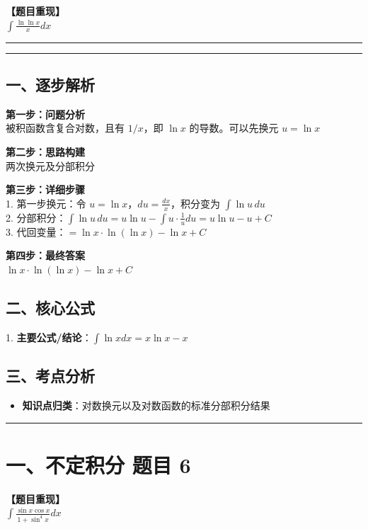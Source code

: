 ﻿\documentclass[12pt, a4paper]{ctexart}
\newcommand{\TopSeparator}{
    \par\noindent\rule{\textwidth}{1.5pt}\vspace{0.5em}
}
\newcommand{\AnalysisSeparator}{
    \par\noindent\rule{\textwidth}{0.5pt}\vspace{0.2em}\hrule\vspace{0.5em}
}
\newenvironment{RedAnalysis}{
    \par
    \color{red} 
}{
    \par
    \color{black} 
}
\begin{document}
\textbf{【题目重现】} \\
$\int \frac{\ln \ln x}{x} dx$

\AnalysisSeparator

\begin{RedAnalysis}

	\subsection*{一、逐步解析}

	\textbf{第一步：问题分析} \\
	被积函数含复合对数，且有 $1/x$，即 $\ln x$ 的导数。可以先换元 $u=\ln x$

	\textbf{第二步：思路构建} \\
	两次换元及分部积分

	\textbf{第三步：详细步骤} \\
	1. 第一步换元：令 $u=\ln x$，$du = \frac{dx}{x}$，积分变为 $\int \ln u \, du$ \\ 
	2. 分部积分：$\int \ln u \, du = u \ln u - \int u \cdot \frac{1}{u} du = u \ln u - u + C$ \\ 
	3. 代回变量：$ = \ln x \cdot \ln(\ln x) - \ln x + C$

	\textbf{第四步：最终答案} \\
	$\ln x \cdot \ln(\ln x) - \ln x + C$

	\subsection*{二、核心公式}
	1. \textbf{主要公式/结论}：$\int \ln x dx = x\ln x - x$

	\subsection*{三、考点分析}
	\begin{itemize}
		\item \textbf{知识点归类}：对数换元以及对数函数的标准分部积分结果
	\end{itemize}

\end{RedAnalysis}

\vspace{2em}

\TopSeparator
\section*{一、不定积分 题目 6}

\textbf{【题目重现】} \\
$\int \frac{\sin x \cos x}{1+\sin^4 x} dx$
\end{document}

